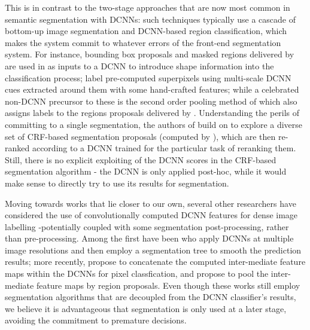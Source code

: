 
This is in contrast to the two-stage approaches that are now most common in semantic segmentation with DCNNs: such techniques typically use a cascade of bottom-up image segmentation and DCNN-based region classification, which makes the system commit to whatever errors of the front-end segmentation system.  
For instance, bounding box proposals and masked regions delivered by \citep{arbelaez2014multiscale, Uijlings13} are used in 
\citet{girshick2014rcnn, hariharan2014simultaneous}  as inputs to a DCNN to introduce  shape information into the classification process;  \citet{mostajabi2014feedforward} label pre-computed superpixels using multi-scale DCNN cues extracted around them with some hand-crafted features; while a celebrated  non-DCNN precursor to these 
is the second order pooling method of \citep{carreira2012semantic} which also assigns labels to the regions proposals delivered by \citep{carreira2012cpmc}. 
Understanding the perils of committing to a single segmentation, the authors of \citet{cogswell2014combining} 
build on \citep{yadollahpour2013discriminative} to explore a diverse set of CRF-based segmentation proposals (computed by \citep{carreira2012cpmc}), which are then re-ranked according to a DCNN trained for the particular task of reranking them.  Still, there is no explicit exploiting of the DCNN scores in  the CRF-based segmentation algorithm - the DCNN is only applied post-hoc, while it would make sense to directly try to use its results for segmentation. 


Moving towards works that lie closer to our own, several other researchers have considered the use of convolutionally computed DCNN features for dense image labelling -potentially coupled with some segmentation post-processing, rather than pre-processing. Among the first have been
\citet{farabet2013learning} who apply DCNNs at multiple image resolutions and then employ a segmentation tree to smooth the prediction results; more recently, \citet{hariharan2014hypercolumns} propose to concatenate the computed inter-mediate feature maps within the DCNNs for pixel classfication, and \citet{dai2014convolutional} propose to pool the inter-mediate feature maps by region proposals. Even though these works still employ  segmentation algorithms that are  decoupled from the DCNN classifier's results, we believe it is advantageous that segmentation is only used at a later stage, avoiding the commitment  to premature decisions. 

